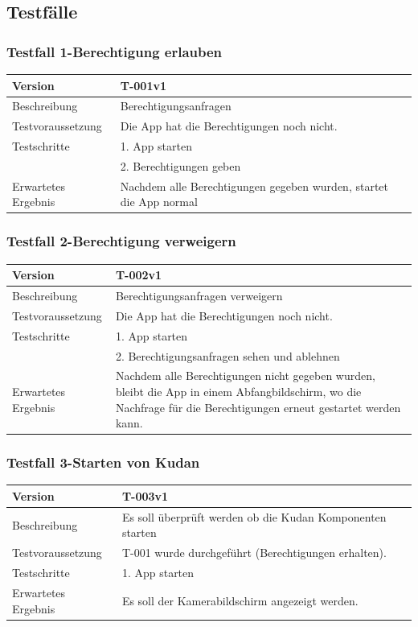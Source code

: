 \documentclass[a4paper]{scrreprt}
\begin{document}
\subsection{Testfälle}
\subsubsection{Testfall 1-Berechtigung erlauben}
\begin{tabularx}{\textwidth}{|l|X|}
\hline 
	Version &
	T-001v1 \\ 
\hline 
	Beschreibung & Berechtigungsanfragen \\ 
\hline 
	Testvoraussetzung & Die App hat die Berechtigungen noch nicht. \\ 
\hline 
	Testschritte &
		1. App starten \\ &
		2. Berechtigungen geben \\
\hline
	Erwartetes Ergebnis & Nachdem alle Berechtigungen gegeben wurden, startet die App normal \\ 
\hline 
\end{tabularx}
\subsubsection{Testfall 2-Berechtigung verweigern}
\begin{tabularx}{\textwidth}{|l|X|}
\hline 
	Version &
	T-002v1 \\ 
\hline 
	Beschreibung & Berechtigungsanfragen verweigern \\ 
\hline 
	Testvoraussetzung & Die App hat die Berechtigungen noch nicht. \\ 
\hline 
	Testschritte &
		1. App starten \\ &
		2. Berechtigungsanfragen sehen und ablehnen \\
\hline
	Erwartetes Ergebnis & Nachdem alle Berechtigungen nicht gegeben wurden, bleibt die App in einem Abfangbildschirm, wo die Nachfrage für die Berechtigungen erneut gestartet werden kann. \\ 
\hline 
\end{tabularx}
\subsubsection{Testfall 3-Starten von Kudan}
\begin{tabularx}{\textwidth}{|l|X|}
\hline 
	Version &
	T-003v1 \\ 
\hline 
	Beschreibung & 
	Es soll überprüft werden ob die Kudan Komponenten starten\\ 
\hline 
	Testvoraussetzung &
	T-001 wurde durchgeführt (Berechtigungen erhalten). \\ 
\hline 
	Testschritte &
		1. App starten \\
\hline
	Erwartetes Ergebnis &
	Es soll der Kamerabildschirm angezeigt werden. \\ 
\hline 
\end{tabularx}
\end{document}
